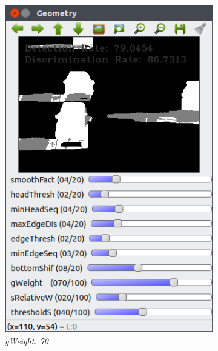 \documentclass[12pt]{report}
\begin{document}
\begin{figure}
  \centering
  \begin{subfigure}{.49\linewidth}
    \includegraphics[width=1\linewidth]{figures/background/geo_highway1_default.png}
    \caption{\textit{gWeight: 70}}
  \end{subfigure}
  \hfill
  \begin{subfigure}{.49\linewidth}

\end{subfigure}
\end{figure}
\end{document}

